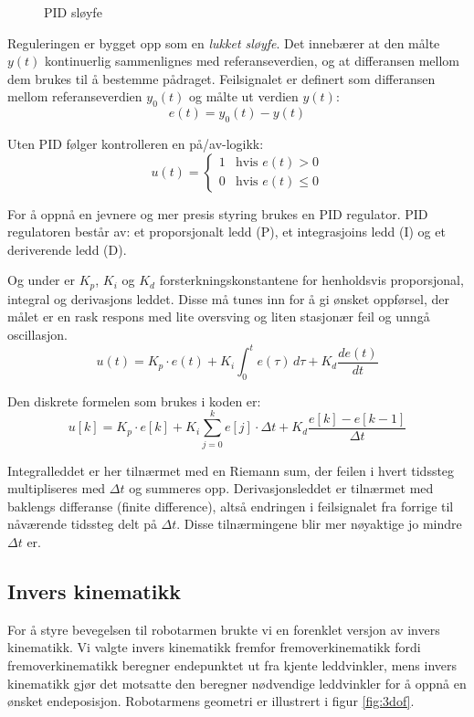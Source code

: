 \begin{figure}[H]
    \centering
    
    \caption{PID sløyfe}
    \label{fig:PID_diagram}
\end{figure}

Reguleringen er bygget opp som en \emph{lukket sløyfe}. Det innebærer at den målte $y(t)$ kontinuerlig sammenlignes med referanseverdien, og at differansen mellom dem brukes til å bestemme pådraget. Feilsignalet er definert som differansen mellom referanseverdien $y_0(t)$ og målte ut verdien $y(t)$:
\begin{equation}
    e(t) = y_0(t) - y(t)
\end{equation}

Uten PID følger kontrolleren en på/av-logikk:
\begin{equation}
    u(t) = \begin{cases} 1 & \text{hvis } e(t) > 0 \\ 0 & \text{hvis } e(t) \leq 0 \end{cases}
\end{equation}

For å oppnå en jevnere og mer presis styring brukes en PID regulator. PID regulatoren består av: et proporsjonalt ledd (P), et integrasjoins ledd (I) og et deriverende ledd (D). 

Og under er $K_p$, $K_i$ og $K_d$ forsterkningskonstantene for henholdsvis proporsjonal, integral og derivasjons leddet. Disse må tunes inn for å gi ønsket oppførsel, der målet er en rask respons med lite oversving og liten stasjonær feil og unngå oscillasjon.
\begin{equation}
    u(t) = K_p \cdot e(t) + K_i \int_0^t e(\tau)\,d\tau + K_d \frac{de(t)}{dt}
\end{equation}

Den diskrete formelen som brukes i koden er:
\begin{equation}
    u[k] = K_p \cdot e[k] + K_i \sum_{j=0}^{k} e[j] \cdot \Delta t + K_d \frac{e[k]-e[k-1]}{\Delta t}
\end{equation}

Integralleddet er her tilnærmet med en Riemann sum, der feilen i hvert tidssteg multipliseres med $\Delta t$ og summeres opp. Derivasjonsleddet er tilnærmet med baklengs differanse (finite difference), altså endringen i feilsignalet fra forrige til nåværende tidssteg delt på $\Delta t$. Disse tilnærmingene blir mer nøyaktige jo mindre $\Delta t$ er.

\subsection{Invers kinematikk}
For å styre bevegelsen til robotarmen brukte vi en forenklet versjon av invers kinematikk. Vi valgte invers kinematikk fremfor fremoverkinematikk fordi fremoverkinematikk beregner endepunktet ut fra kjente leddvinkler, mens invers kinematikk gjør det motsatte den beregner nødvendige leddvinkler for å oppnå en ønsket endeposisjon. Robotarmens geometri er illustrert i figur \ref{fig:3dof}.

